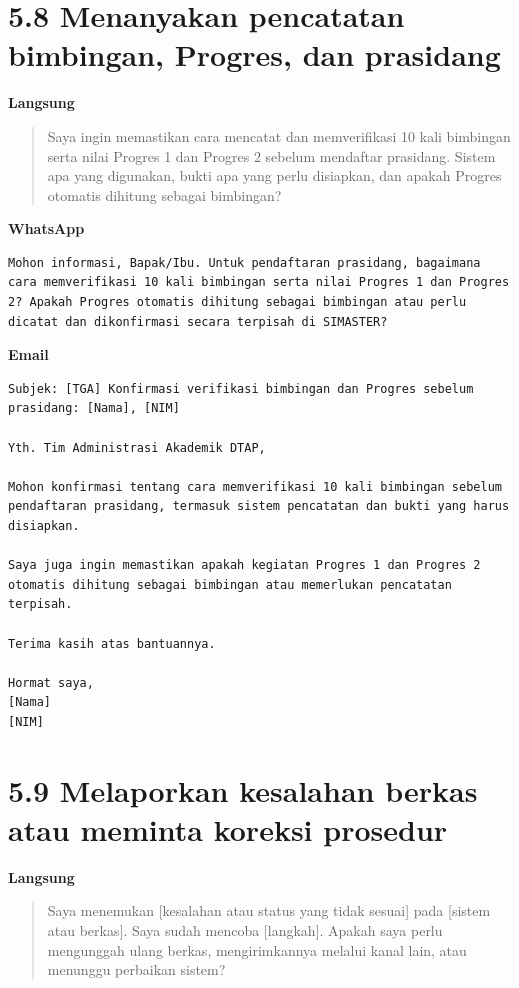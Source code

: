 \documentclass[
  indonesian,
]{article}
\renewcommand{\subsection}{\section}
\begin{document}
\subsection{5.8 Menanyakan pencatatan bimbingan, Progres, dan
prasidang}\label{menanyakan-pencatatan-bimbingan-progres-dan-prasidang}

\textbf{Langsung}

\begin{quote}
Saya ingin memastikan cara mencatat dan memverifikasi 10 kali bimbingan
serta nilai Progres 1 dan Progres 2 sebelum mendaftar prasidang. Sistem
apa yang digunakan, bukti apa yang perlu disiapkan, dan apakah Progres
otomatis dihitung sebagai bimbingan?
\end{quote}

\textbf{WhatsApp}

\begin{verbatim}
Mohon informasi, Bapak/Ibu. Untuk pendaftaran prasidang, bagaimana cara memverifikasi 10 kali bimbingan serta nilai Progres 1 dan Progres 2? Apakah Progres otomatis dihitung sebagai bimbingan atau perlu dicatat dan dikonfirmasi secara terpisah di SIMASTER?
\end{verbatim}

\textbf{Email}

\begin{verbatim}
Subjek: [TGA] Konfirmasi verifikasi bimbingan dan Progres sebelum prasidang: [Nama], [NIM]

Yth. Tim Administrasi Akademik DTAP,

Mohon konfirmasi tentang cara memverifikasi 10 kali bimbingan sebelum pendaftaran prasidang, termasuk sistem pencatatan dan bukti yang harus disiapkan.

Saya juga ingin memastikan apakah kegiatan Progres 1 dan Progres 2 otomatis dihitung sebagai bimbingan atau memerlukan pencatatan terpisah.

Terima kasih atas bantuannya.

Hormat saya,
[Nama]
[NIM]
\end{verbatim}

\subsection{5.9 Melaporkan kesalahan berkas atau meminta koreksi
prosedur}\label{melaporkan-kesalahan-berkas-atau-meminta-koreksi-prosedur}

\textbf{Langsung}

\begin{quote}
Saya menemukan {[}kesalahan atau status yang tidak sesuai{]} pada
{[}sistem atau berkas{]}. Saya sudah mencoba {[}langkah{]}. Apakah saya
perlu mengunggah ulang berkas, mengirimkannya melalui kanal lain, atau
menunggu perbaikan sistem?
\end{quote}
\end{document}
